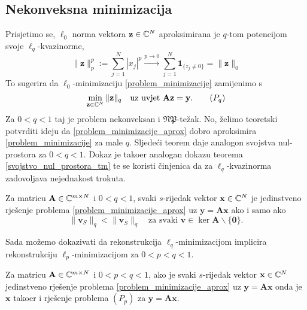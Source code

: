 \documentclass[a4paper,twoside,12pt]{memoir} %
\newcommand{\vect}[1]{\mathbf{#1}}
\renewcommand{\vec}{\vect}
\newcommand{\norm}[1]{\|{#1}\|}
\begin{document}
\subsection[Nekonveksna minimizacija][Nekonveksna minimizacija]{Nekonveksna minimizacija}
Prisjetimo se, $\ell_0$ norma vektora $\vec z \in \C^N$ aproksimirana je $q$-tom potencijom svoje $\ell_q$-kvazinorme,
\begin{equation*}
\|\vec{z}\|_p^p := \sum_{j=1}^N|x_j|^p \xrightarrow{p\rightarrow 0} \sum_{j=1}^N\mathbf{1}_{\{z_j \neq 0\}} = \|\vec{z}\|_0
\end{equation*}
To sugerira da $\ell_0$-minimizaciju \eqref{problem_minimizacije} zamijenimo s
\begin{equation}
    \min_{\vec z \in \C^N} \norm{\vec z}_q \quad \text{uz uvjet }\vec{Az} = \vec{y}.\tag{$P_q$}
\end{equation}
Za $0 < q < 1$ taj je problem nekonveksan i $\mathfrak{NP}$-te\v{z}ak. No, \v{z}elimo teoretski potvrditi ideju da \eqref{problem_minimizacije_aprox} dobro aproksimira \eqref{problem_minimizacije} za male $q$.
Sljede\'ci teorem daje analogon svojstva nul-prostora za $0<q<1$. Dokaz je tako\dj er analogan dokazu teorema \ref{svojstvo_nul_prostora_tm} te se koristi \v{c}injenica da za $\ell_q$-kvazinorma zadovoljava nejednakost trokuta.  
\begin{thm}\label{svojstvo_nul_prostora_tm_2}
    Za matricu $\vec A \in \C^{m \times N}$ i $0<q<1$, svaki $s$-rijedak vektor $\vec x \in \C^N$ je jedinstveno rje\v{s}enje problema \eqref{problem_minimizacije_aprox} uz $\vec y = \vec{Ax}$ ako i samo ako 
    \begin{equation*}
        \norm{\vec v_S}_q < \norm{\vec v_{\bar{S}}}_q  \quad \text{za svaki }\vec v \in \ker \vec A \backslash \{\vec 0\}.
    \end{equation*}
\end{thm}
Sada mo\v{z}emo dokazivati da rekonstrukcija $\ell_q$-minimizacijom implicira rekonstrukciju $\ell_p$-minimizacijom za $0<p<q<1$.
\begin{thm}
    Za matricu $\vec A \in \C^{m \times N}$ i $0<p<q<1$, ako je svaki $s$-rijedak vektor $\vec x \in \C^N$ jedinstveno rje\v{s}enje problema \eqref{problem_minimizacije_aprox} uz $\vec y = \vec{Ax}$  onda je $\vec x$ tako\dj er i rje\v{s}enje problema $(P_p)$ za $\vec y = \vec{Ax}$.
\end{thm}
\end{document}
